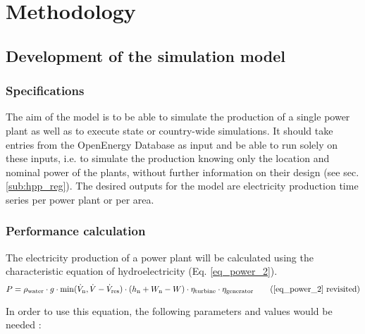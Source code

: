 \chapter{Methodology}
\label{chap:methodology}

\section{Development of the simulation model}

\subsection{Specifications}
\label{sub:spec}

The aim of the model is to be able to simulate the production of a single power plant as well as to execute state or country-wide simulations. It should take entries from the OpenEnergy Database as input and be able to run solely on these inputs, i.e. to simulate the production knowing only the location and nominal power of the plants, without further information on their design (see sec. \ref{sub:hpp_reg}). 
The desired outputs for the model are electricity production time series per power plant or per area.


\subsection{Performance calculation}
\label{sub:perf_calc}

The electricity production of a power plant will be calculated using the characteristic equation of hydroelectricity (Eq. \eqref{eq_power_2}).
\begin{equation*}
 P = \rho_\mathrm{water} \cdot g \cdot \min(\dot{V}_\mathrm{n},\dot{V}-\dot{V}_\mathrm{res}) \cdot (h_\mathrm{n} +W_\mathrm{n}-W) \cdot \eta_\mathrm{turbine} \cdot \eta_\mathrm{generator}\tag{\ref{eq_power_2} revisited}
\end{equation*}

In order to use this equation, the following parameters and values would be needed : 

